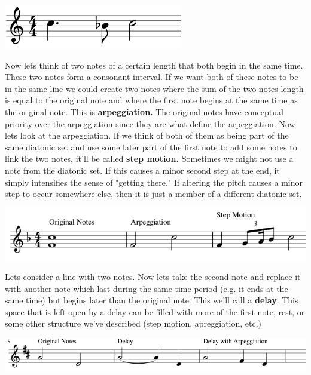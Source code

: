 \documentclass{article}
\begin{document}
\begin{center}
  \includegraphics[width=0.26\linewidth]{3ex3.png}
\end{center}
Now lets think of two notes of a certain length that both begin in the same time. These two notes form a consonant interval. If we want both of these notes to be in the same line we could create two notes where the sum of the two notes length is equal to the original note and where the first note begins at the same time as the original note. This is \textbf{arpeggiation.}
The original notes have conceptual priority over the arpeggiation since they are what define the arpeggiation. Now lets look at the arpeggiation. If we think of both of them as being part of the same diatonic set and use some later part of the first note to add some notes to link the two notes, it'll be called \textbf{step motion.} Sometimes we might not use a note from the diatonic set. If this causes a minor second step at the end, it simply intensifies the sense of "getting there." If altering the pitch causes a minor step to occur somewhere else, then it is just a member of a different diatonic set.
\begin{center}
  \includegraphics[width=0.75\linewidth]{f31.png}
\end{center}
Lets consider a line with two notes. Now lets take the second note and replace it with another note which last during the same time period (e.g. it ends at the same time) but begins later than the original note. This we'll call a \textbf{delay}. This space that is left open by a delay can be filled with more of the first note, rest, or some other structure we've described (step motion, apreggiation, etc.)
\begin{center}
  \includegraphics[width=0.75\linewidth]{f32.png}
\end{center}
\end{document}
